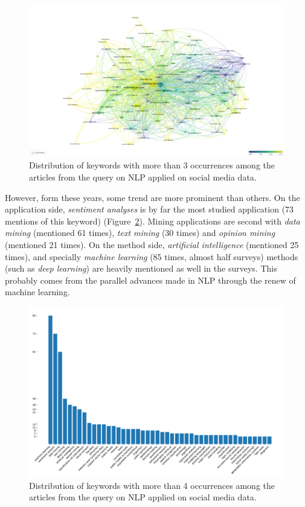 \begin{landscape}
    \begin{figure}[htb]
        \includegraphics[width=\paperwidth,height=\paperheight,keepaspectratio]{figures/chap-2/nlp-overlay.pdf}
        \caption{Distribution of keywords with more than 3 occurrences among the articles from the query on NLP applied on social media data.}
        \label{literature:nlp-overlay}
    \end{figure}
\end{landscape}

However, form these years, some trend are more prominent than others.
On the application side, \emph{sentiment analyses} is by far the most studied application (73 mentions of this keyword) (Figure~\ref{literature:nlp-bar}).
Mining applications are second with \emph{data mining} (mentioned 61 times), \emph{text mining} (30 times) and \emph{opinion mining} (mentioned 21 times).
On the method side, \emph{artificial intelligence} (mentioned 25 times), and specially \emph{machine learning} (85 times, almost half surveys) methods (such as \emph{deep learning}) are heavily mentioned as well in the surveys.
This probably comes from the parallel advances made in NLP through the renew of machine learning.

\begin{figure}[htb]
    \centering
    \includegraphics[width=\textwidth]{figures/chap-2/nlp-bar.pdf}
    \caption{Distribution of keywords with more than 4 occurrences among the articles from the query on NLP applied on social media data.}
    \label{literature:nlp-bar}
\end{figure}

